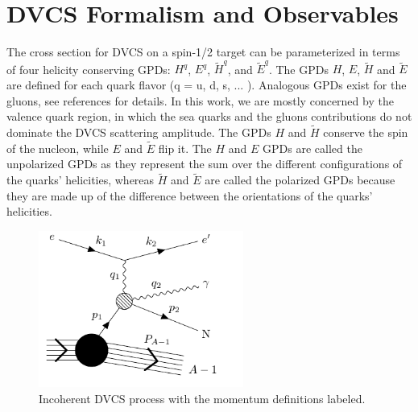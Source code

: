\section{DVCS Formalism and Observables}

The cross section for DVCS on a spin-1/2 target can be parameterized in terms 
of four helicity conserving GPDs: $H^q$, $E^q$, $\tilde{H}^q$, and 
$\tilde{E}^q$. The GPDs $H$, $E$, $\widetilde{H}$ and $\widetilde{E}$ are 
defined for each quark flavor (q = u, d, s, ... ). Analogous GPDs exist for the 
gluons, see references \cite{PhysRevLett.78.610,PhysRevD.56.5524,Goeke:2001tz} for details.  In 
this work, we are mostly concerned by the valence quark region, in which the 
sea quarks and the gluons contributions do not dominate the DVCS scattering 
amplitude. The GPDs $H$ and $\widetilde{H}$ conserve the spin of the nucleon, 
while $E$ and $\widetilde{E}$ flip it. The $H$ and $E$ GPDs are called the 
unpolarized GPDs as they represent the sum over the different configurations of 
the quarks' helicities, whereas $\widetilde{H}$ and $\widetilde{E}$ are called 
the polarized GPDs because they are made up of the difference between the 
orientations of the quarks' helicities.




\begin{figure}
   \centering
   \includegraphics[width=0.60\textwidth]{figures/dvcs_feynman-figure5.pdf}
   \caption{\label{fig:dvcsMomenta}Incoherent DVCS process with the momentum 
   definitions labeled.}
\end{figure}

